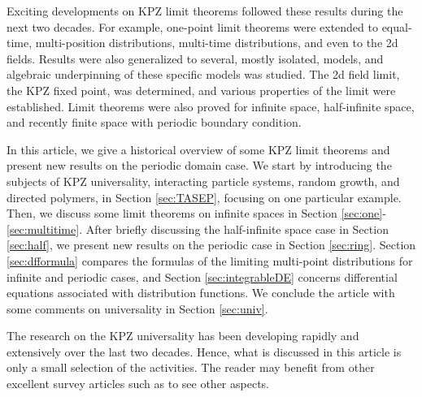 \documentclass[10pt]{article}
\theoremstyle{plain}
\theoremstyle{definition}
\numberwithin{equation}{section}
\begin{document}
Exciting developments on KPZ limit theorems followed these results during the next two decades. 
For example, one-point limit theorems were extended to equal-time, multi-position distributions, multi-time distributions, and even to the 2d fields. 
Results were also generalized to several, mostly isolated, models, and algebraic underpinning of these specific models was studied. 
The 2d field limit, the KPZ fixed point, was determined, and various properties of the limit were established. 
Limit theorems were also proved for infinite space, half-infinite space, and recently finite space with periodic boundary condition. 

In this article, we give a historical overview of some KPZ limit theorems and present new results on the periodic domain case.
We start by introducing the subjects of KPZ universality, interacting particle systems, random growth, and directed polymers, in Section \ref{sec:TASEP}, focusing on one particular example. 
Then, we discuss some limit theorems on infinite spaces in Section \ref{sec:one}-\ref{sec:multitime}. 
After briefly discussing the half-infinite space case in Section \ref{sec:half}, we present new results on the periodic case in Section \ref{sec:ring}.
Section \ref{sec:dfformula} compares the formulas of the limiting multi-point distributions for infinite and periodic cases, and Section \ref{sec:integrableDE} concerns differential equations associated with distribution functions. 
We conclude the article with some comments on universality in Section \ref{sec:univ}. 


The research on the KPZ universality has been developing rapidly and extensively over the last two decades.  
Hence, what is discussed in this article is only a small selection of the activities. 
The reader may benefit from other excellent survey articles such as \cite{Corwin11, Quastel12, Borodin-Gorin16} to see other aspects. 
\end{document}
